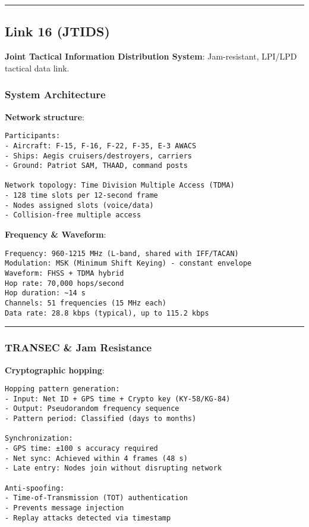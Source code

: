 \begin{center}\rule{0.5\linewidth}{0.5pt}\end{center}

\subsection{\texorpdfstring{ Link 16
(JTIDS)}{ Link 16 (JTIDS)}}\label{link-16-jtids}

\textbf{Joint Tactical Information Distribution System}: Jam-resistant,
LPI/LPD tactical data link.

\subsubsection{System Architecture}\label{system-architecture}

\textbf{Network structure}:

\begin{verbatim}
Participants:
- Aircraft: F-15, F-16, F-22, F-35, E-3 AWACS
- Ships: Aegis cruisers/destroyers, carriers
- Ground: Patriot SAM, THAAD, command posts

Network topology: Time Division Multiple Access (TDMA)
- 128 time slots per 12-second frame
- Nodes assigned slots (voice/data)
- Collision-free multiple access
\end{verbatim}

\textbf{Frequency \& Waveform}:

\begin{verbatim}
Frequency: 960-1215 MHz (L-band, shared with IFF/TACAN)
Modulation: MSK (Minimum Shift Keying) - constant envelope
Waveform: FHSS + TDMA hybrid
Hop rate: 70,000 hops/second
Hop duration: ~14 s
Channels: 51 frequencies (15 MHz each)
Data rate: 28.8 kbps (typical), up to 115.2 kbps
\end{verbatim}

\begin{center}\rule{0.5\linewidth}{0.5pt}\end{center}

\subsubsection{TRANSEC \& Jam Resistance}\label{transec-jam-resistance}

\textbf{Cryptographic hopping}:

\begin{verbatim}
Hopping pattern generation:
- Input: Net ID + GPS time + Crypto key (KY-58/KG-84)
- Output: Pseudorandom frequency sequence
- Pattern period: Classified (days to months)

Synchronization:
- GPS time: ±100 s accuracy required
- Net sync: Achieved within 4 frames (48 s)
- Late entry: Nodes join without disrupting network

Anti-spoofing:
- Time-of-Transmission (TOT) authentication
- Prevents message injection
- Replay attacks detected via timestamp
\end{verbatim}

